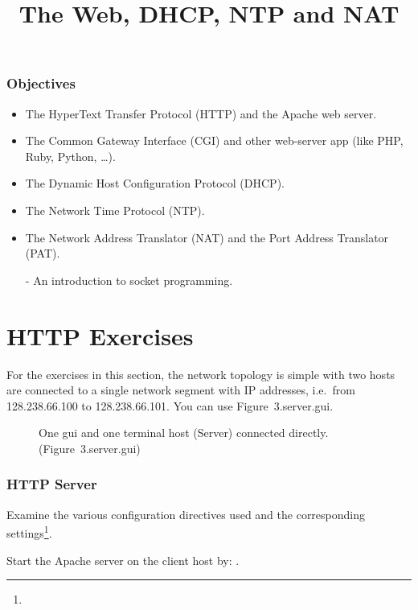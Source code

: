 \documentclass{../UTNetLab}
\title{The Web, DHCP, NTP and NAT}
\begin{document}
\section*{Objectives}
\begin{itemize}
    \item The HyperText Transfer Protocol (HTTP) and the Apache web server.
    \item The Common Gateway Interface (CGI) and other web-server app (like PHP, Ruby, Python, \dots).
    \item The Dynamic Host Configuration Protocol (DHCP).
    \item The Network Time Protocol (NTP).
    \item The Network Address Translator (NAT) and the Port Address Translator (PAT).
    \item [-] An introduction to socket programming.
\end{itemize}
\part{HTTP Exercises}
For the exercises in this section, the network topology is simple with two hosts are connected to a single network segment with IP addresses, i.e.\  from 128.238.66.100 to 128.238.66.101.
You can use {Figure~3.server.gui}.

\begin{figure}[H]
    \centering
    \caption{One gui and one terminal host (Server) connected directly. (Figure~3.server.gui)}
    \label{fig:two-gui}
\end{figure}

\section{HTTP Server}
Examine the various configuration directives used and the corresponding settings\footnote{}.

Start the Apache server on the client host by: .
\end{document}
